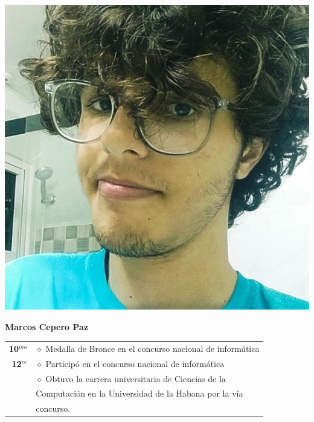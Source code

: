 \begin{minipage}{0.2\textwidth}
	\includegraphics[width=\linewidth]{img/concursantes/marco.png} %
\end{minipage}
\hfill
\begin{minipage}{0.7\textwidth}
	\textbf{Marcos Cepero Paz}
	
	\vspace*{0.1in}
	\begin{tabular}{rl}
		
		\textbf{10$^{mo}$} & $\diamond$ Medalla de Bronce en el concurso nacional de informática  \\
		
		
		\textbf{12$^{ce}$} 
		& $\diamond$ Participó en el concurso nacional de informática\\
		&   $\diamond$ Obtuvo la carrera universitaria de Ciencias de la \\
		& Computación en la Universidad de la Habana por la vía \\
		& concurso. \\
		
		
	\end{tabular}
	
\end{minipage}

